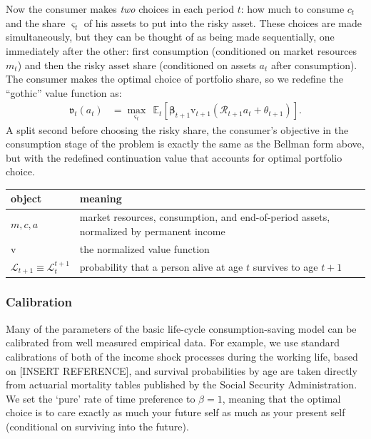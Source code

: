 \documentclass{article}
\newcommand{\Rport}{\mathcal{R}}
\newcommand{\vFunc}{\mathrm{v}}
\newcommand{\Alive}{\mathcal{L}}
\newcommand{\Ex}{\mathbb{E}}
\newcommand{\cNrm}{c}
\newcommand{\aNrm}{a}
\newcommand{\mNrm}{m}
\begin{document}
Now the consumer makes \textit{two} choices in each period $t$: how much to consume $\cNrm_t$ and the share $\varsigma_t$ of his assets to put into the risky asset.
These choices are made simultaneously, but they can be thought of as being made sequentially, one immediately after the other: first consumption (conditioned on market resources $\mNrm_t$) and then the risky asset share (conditioned on assets $\aNrm_t$ after consumption).
The consumer makes the optimal choice of portfolio share, so we redefine the ``gothic'' value function as:
\begin{align}
\mathfrak{v}_{t}(\aNrm_t) & = \max_{\varsigma_t}~~ \Ex_{t}\left[ \pmb{\beta}_{t+1} \vFunc_{t+1}(\Rport_{t+1} \aNrm_t + \theta_{t+1}) \right].
\end{align}
A split second before choosing the risky share, the consumer's objective in the consumption stage of the problem is exactly the same as the Bellman form above, but with the redefined continuation value that accounts for optimal portfolio choice.

\bigskip\noindent
\begin{tabular}{p{}p{}}
\toprule
object & meaning \\
\hline
$\mNrm, \cNrm, \aNrm$ & market resources, consumption, and end-of-period assets, normalized by permanent income \\
$\vFunc$ & the normalized value function \\
$\Alive_{t+1} \equiv \Alive_{t}^{t+1}$ & probability that a person alive at age $t$ survives to age $t+1$ \\
\bottomrule
\end{tabular}

\bigskip\subsubsection{Calibration}

Many of the parameters of the basic life-cycle consumption-saving model can be calibrated from well measured empirical data.
For example, we use standard calibrations of both of the income shock processes during the working life, based on [INSERT REFERENCE], and
survival probabilities by age are taken directly from actuarial mortality tables published by the Social Security Administration.
We set the `pure' rate of time preference to $\beta=1$, meaning that the optimal choice is to care exactly as much your future self as much as your present self (conditional on surviving into the future).
\end{document}
